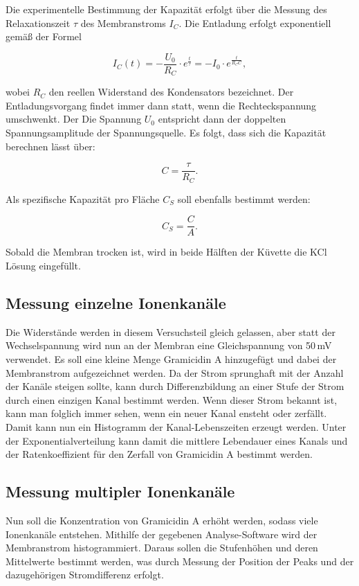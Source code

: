 \documentclass[a4paper,ngerman]{scrartcl}
\begin{document}
Die experimentelle Bestimmung der Kapazität erfolgt über die Messung des Relaxationszeit $\tau$ des Membranstroms $I_C$. Die Entladung erfolgt
exponentiell gemäß der Formel

\begin{equation}
  I_C(t) = - \frac{U_0}{R_C} \cdot e^{\frac{t}{\tau}} = - I_0 \cdot e^{\frac{t}{R_C C}},
\end{equation}

wobei $R_C$ den reellen Widerstand des Kondensators bezeichnet. Der Entladungsvorgang findet immer dann statt, wenn die Rechteckspannung umschwenkt. Der Die Spannung $U_0$ entspricht dann der doppelten Spannungsamplitude der Spannungsquelle.
Es folgt, dass sich die Kapazität berechnen lässt über:

\begin{equation}
  C = \frac{\tau}{R_C}.
\end{equation}

Als spezifische Kapazität pro Fläche $C_S$ soll ebenfalls bestimmt werden:

\begin{equation}
  C_S = \frac{C}{A}.
\end{equation}

Sobald die Membran trocken ist, wird in beide Hälften der Küvette die KCl Lösung eingefüllt.

\subsection{Messung einzelne Ionenkanäle}
\label{sec:singlechannels}
Die Widerstände werden in diesem Versuchsteil gleich gelassen, aber statt der Wechselspannung wird nun an der Membran eine Gleichspannung 
von 50\,mV verwendet. Es soll eine kleine Menge Gramicidin A hinzugefügt und dabei der Membranstrom aufgezeichnet werden. Da der Strom 
sprunghaft mit der Anzahl der Kanäle steigen sollte, kann durch Differenzbildung an einer Stufe der Strom durch einen einzigen Kanal bestimmt werden. Wenn dieser Strom bekannt ist, kann man folglich immer sehen, wenn ein neuer Kanal ensteht oder zerfällt.\\

Damit kann nun ein Histogramm der Kanal-Lebenszeiten erzeugt werden. Unter der Exponentialverteilung kann damit die mittlere Lebendauer 
eines Kanals und der Ratenkoeffizient für den Zerfall von Gramicidin A bestimmt werden.

\subsection{Messung multipler Ionenkanäle}
\label{sec:multiplechannels}
Nun soll die Konzentration von Gramicidin A erhöht werden, sodass viele Ionenkanäle entstehen. Mithilfe der gegebenen Analyse-Software
wird der Membranstrom histogrammiert. Daraus sollen die Stufenhöhen und deren Mittelwerte bestimmt werden, was durch Messung der Position der Peaks und der dazugehörigen Stromdifferenz erfolgt.
\end{document}
